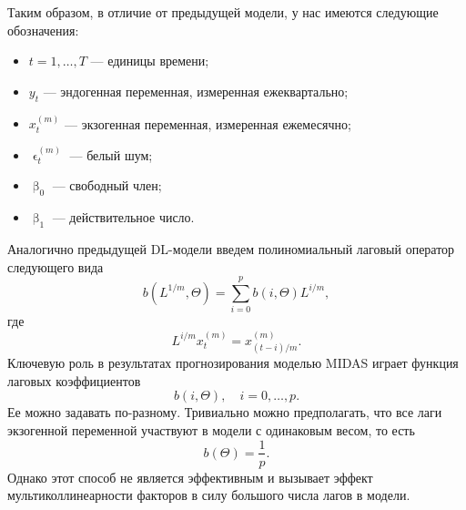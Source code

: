 \documentclass[a4paper, 12pt]{extarticle}
\numberwithin{equation}{subsection}
\renewcommand{\beta}{\upbeta}
\renewcommand{\epsilon}{\upvarepsilon}
\begin{document}
	Таким образом, в отличие от предыдущей модели, у нас имеются следующие обозначения:
	\begin{itemize}
		\item $t = 1,\ldots, T$ --- единицы времени;
		\item $y_{t}$ --- эндогенная переменная, измеренная ежеквартально; 
		\item $x^{(m)}_{t}$ --- экзогенная переменная, измеренная ежемесячно;
		\item $\epsilon_t^{(m)}$ --- белый шум;
		\item $\beta_0$ --- свободный член;
		\item $\beta_1$ --- действительное число.
	\end{itemize}
	Аналогично предыдущей DL-модели введем полиномиальный лаговый оператор следующего вида 
	\begin{equation}
	b(L^{1/m}, \Theta) = \sum_{i=0}^{p} b(i, \Theta) L^{i/m},
	\end{equation}
	где 
	\begin{equation}
		L^{i/m}x_t^{(m)} = x_{(t-i)/m}^{(m)}.
	\end{equation}
	Ключевую роль в результатах прогнозирования моделью MIDAS играет функция лаговых коэффициентов 
	\begin{equation}
		b(i, \Theta),\quad i=0,\ldots,p.
	\end{equation}
	Ее можно задавать по-разному. Тривиально можно предполагать, что все лаги экзогенной переменной участвуют в модели с одинаковым весом, то есть 
	\begin{equation}
		b(\Theta) = \dfrac{1}{p}.
	\end{equation}
	Однако этот способ не является эффективным и вызывает эффект мультиколлинеарности факторов в силу большого числа лагов в модели.
	
\end{document}
